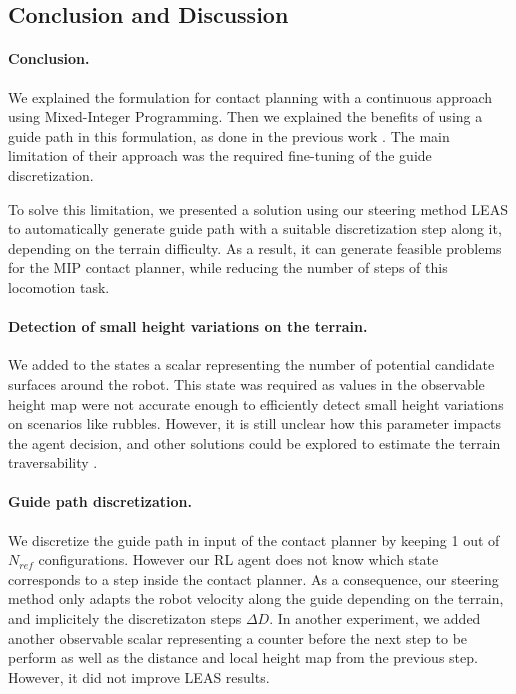 \subsection{Conclusion and Discussion}
\label{subsub:mip:discussion}
\paragraph{Conclusion.}
We explained the formulation for contact planning with a continuous approach using Mixed-Integer Programming.
Then we explained the benefits of using a guide path in this formulation, as done in the previous work \cite{sl1m_v2}.
The main limitation of their approach was the required fine-tuning of the guide discretization.

To solve this limitation, we presented a solution using our steering method LEAS to automatically generate guide path with a suitable discretization step along it, depending on the terrain difficulty.
As a result, it can generate feasible problems for the MIP contact planner, while reducing the number of steps of this locomotion task.


\paragraph{Detection of small height variations on the terrain.}
We added to the states a scalar representing the number of potential candidate surfaces around the robot.
This state was required as values in the observable height map were not accurate enough to efficiently detect small height variations on scenarios like rubbles.
However, it is still unclear how this parameter impacts the agent decision, and other solutions could be explored to estimate the terrain traversability \cite{lin_traversability_2018, brandao_multimode_2019}.

\paragraph{Guide path discretization.}
We discretize the guide path in input of the contact planner by keeping 1 out of $N_{ref}$ configurations.
However our RL agent does not know which state corresponds to a step inside the contact planner.
As a consequence, our steering method only adapts the robot velocity along the guide depending on the terrain, and implicitely the discretizaton steps $\Delta D$.
In another experiment, we added another observable scalar representing a counter before the next step to be perform as well as the distance and local height map from the previous step. However, it did not improve LEAS results.

